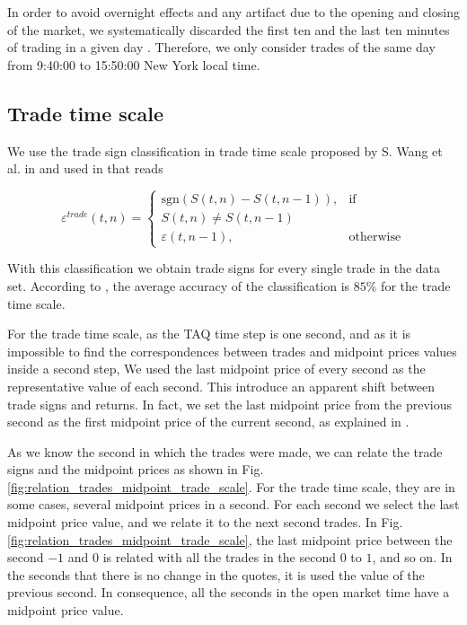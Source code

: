 In order to avoid overnight effects and any artifact due to the opening and
closing of the market, we systematically discarded the first ten and the last
ten minutes of trading in a given day
\cite{spread_changes_affect,Bouchaud_2004,Wang_2016_cross,large_prices_changes}.
Therefore, we only consider trades of the same day from 9:40:00 to 15:50:00
New York local time.

\subsection{Trade time scale}\label{subsec:trade_time}

We use the trade sign classification in trade time scale proposed by S. Wang et
al. in \cite{Wang_2016_cross} and used in
\cite{Wang_2016_avg,Wang_2017,Wang_2018_copulas} that reads

\begin{equation}\label{eq:trade_signs_trade}
    \varepsilon^{trade}\left(t,n\right)=\left\{
    \begin{array}{cc}
    \text{sgn}\left(S\left(t,n\right)-S\left(t,n-1\right)\right),
    & \text{if }\\ S\left(t,n\right) \ne S\left(t,n-1\right)\\
    \varepsilon\left(t,n-1\right),
    & \text{otherwise}
    \end{array}\right.
\end{equation}

With this classification we obtain trade signs for every single trade in the
data set. According to \cite{Wang_2016_cross}, the average accuracy of the
classification is $85\%$ for the trade time scale.

For the trade time scale, as the TAQ time step is one second, and as it is
impossible to find the correspondences between trades and midpoint prices
values inside a second step, We used the last midpoint price of every second as
the representative value of each second. This introduce an apparent shift
between trade signs and returns. In fact, we set the last midpoint price from
the previous second as the first midpoint price of the current second, as
explained in \cite{Wang_2016_cross}.

As we know the second in which the trades were made, we can relate the trade
signs and the midpoint prices as shown in Fig.
\ref{fig:relation_trades_midpoint_trade_scale}. For the trade time scale, they
are in some cases, several midpoint prices in a second. For each second we
select the last midpoint price value, and we relate it to the next second
trades. In Fig. \ref{fig:relation_trades_midpoint_trade_scale}, the last
midpoint price between the second $-1$ and $0$ is related with all the trades
in the second $0$ to $1$, and so on. In the seconds that there is no change in
the quotes, it is used the value of the previous second. In consequence, all
the seconds in the open market time have a midpoint price value.

